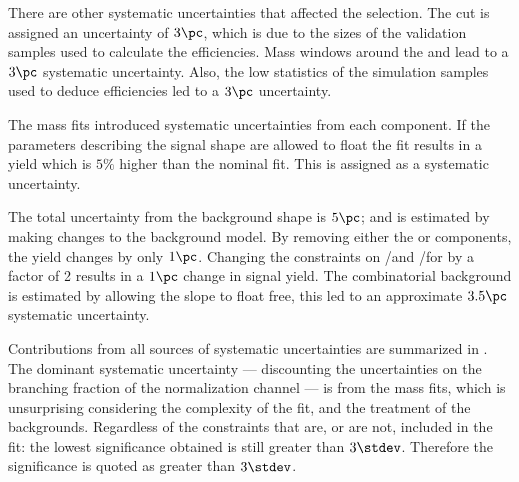 There are other systematic uncertainties that affected the selection.
The \bdt cut is assigned an uncertainty of $3\pc$, which is due to the sizes of the
validation samples used to calculate the efficiencies.
Mass windows around the \Ds and \phii lead to a $3\pc$ systematic uncertainty.
Also, the low statistics of the simulation samples used to deduce efficiencies led to a $3\pc$
uncertainty.

The mass fits introduced systematic uncertainties from each component.
If the parameters describing the signal shape are allowed to float the fit results in a yield which is
$5\%$ higher than the nominal fit.
This is assigned as a systematic uncertainty.


The total uncertainty from the background shape is $5\pc$; and is estimated by making changes to
the background model.
By removing either the \btodsstrphi or \bstodsstrkstrk components, the yield changes by only $1\pc$.
Changing the constraints on \rA/\rB and \rC/\rD for \bstodskstrk by a factor of 2 results in a
$1\pc$ change in signal yield.
The combinatorial background is estimated by allowing the slope to float free, this led to an
approximate $3.5\pc$ systematic uncertainty.


Contributions from all sources of systematic uncertainties are summarized in .
The dominant systematic uncertainty --- discounting the uncertainties on the branching fraction of
the normalization channel --- is from the mass fits, which is unsurprising considering the
complexity of the fit, and the treatment of the backgrounds.
Regardless of the constraints that are, or are not, included in the fit: the lowest
significance obtained is still greater than $3\stdev$.
Therefore the significance is quoted as greater than $3\stdev$.

